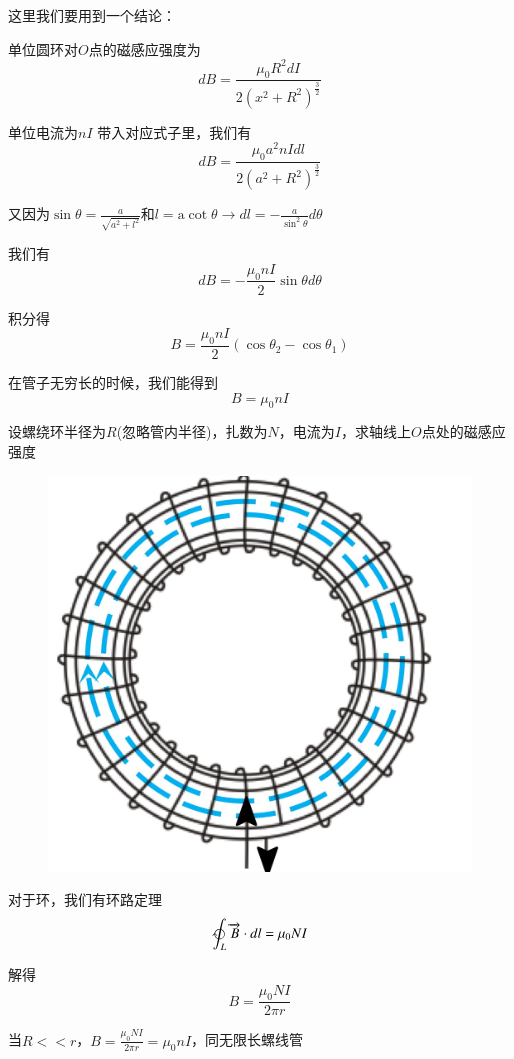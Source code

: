 \documentclass[lang=cn,10pt]{elegantbook}
\begin{document}
	\begin{solution}
		这里我们要用到一个结论：
		
		单位圆环对$O$点的磁感应强度为
		\begin{equation*}
			dB=\frac{\mu _0R^2dI}{2\left( x^2+R^2 \right) ^{\frac{3}{2}}}
		\end{equation*}
		
		单位电流为$nI$
		带入对应式子里，我们有
		\begin{equation*}
			dB=\frac{\mu _0a^2nIdl}{2\left( a^2+R^2 \right) ^{\frac{3}{2}}}
		\end{equation*}
		
		又因为$\sin \theta =\frac{a}{\sqrt{a^2+l^2}}\text{和}l=\mathrm{a}\cot \theta \rightarrow dl=-\frac{a}{\sin ^2\theta}d\theta$
		
		我们有
		\begin{equation*}
			dB=-\frac{\mu _0 nI}{2}\sin \theta d\theta 
		\end{equation*}
		
		积分得
		\begin{equation*}
			B=\frac{\mu _0nI}{2}\left( \cos \theta _2-\cos \theta _1 \right) 
		\end{equation*}
	\end{solution}
	\begin{note}
		在管子无穷长的时候，我们能得到
		\begin{equation*}
				B=\mu _0nI
		\end{equation*}
	\end{note}
	\begin{example}
		设螺绕环半径为$R$(忽略管内半径)，扎数为$ N$，电流为$I$，求轴线上$O$点处的磁感应强度
		
\begin{figure}[H]
	\centering
	\includegraphics[width=0.18\linewidth]{image/IMG_0427(20231121-205357)}
	\caption{}
	\label{fig:img042720231121-205357}
\end{figure}
	\end{example}
	\begin{solution}
		对于环，我们有环路定理
		\begin{equation*}
			\ointclockwise_L{\overrightarrow{B}\cdot dl}=\mu _0NI
		\end{equation*}
		
		解得
		\begin{equation*}
			B=\frac{\mu _0NI}{2\pi r}
		\end{equation*}
	\end{solution}
	\begin{note}
		当$R<<r$，$B=\frac{\mu _0NI}{2\pi r}=\mu _0 nI$，同无限长螺线管
	\end{note}
\end{document}
